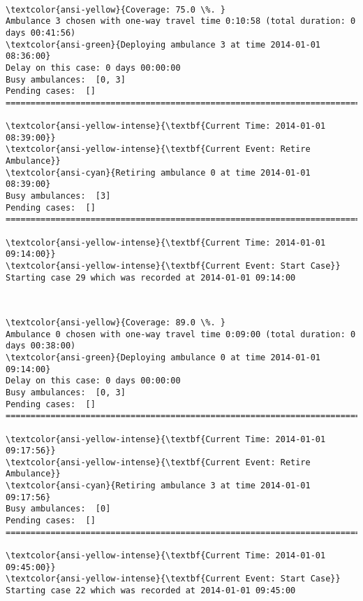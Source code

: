 \documentclass[11pt]{article}
\begin{document}
    \begin{center}
    \end{center}
    { \hspace*{\fill} \\}
    
    \begin{Verbatim}[commandchars=\\\{\}]
\textcolor{ansi-yellow}{Coverage: 75.0 \%. }
Ambulance 3 chosen with one-way travel time 0:10:58 (total duration: 0 days 00:41:56)
\textcolor{ansi-green}{Deploying ambulance 3 at time 2014-01-01 08:36:00}
Delay on this case: 0 days 00:00:00
Busy ambulances:  [0, 3]
Pending cases:  []
========================================================================

\textcolor{ansi-yellow-intense}{\textbf{Current Time: 2014-01-01 08:39:00}}
\textcolor{ansi-yellow-intense}{\textbf{Current Event: Retire Ambulance}}
\textcolor{ansi-cyan}{Retiring ambulance 0 at time 2014-01-01 08:39:00}
Busy ambulances:  [3]
Pending cases:  []
========================================================================

\textcolor{ansi-yellow-intense}{\textbf{Current Time: 2014-01-01 09:14:00}}
\textcolor{ansi-yellow-intense}{\textbf{Current Event: Start Case}}
Starting case 29 which was recorded at 2014-01-01 09:14:00

    \end{Verbatim}

    \begin{center}
    \end{center}
    { \hspace*{\fill} \\}
    
    \begin{Verbatim}[commandchars=\\\{\}]
\textcolor{ansi-yellow}{Coverage: 89.0 \%. }
Ambulance 0 chosen with one-way travel time 0:09:00 (total duration: 0 days 00:38:00)
\textcolor{ansi-green}{Deploying ambulance 0 at time 2014-01-01 09:14:00}
Delay on this case: 0 days 00:00:00
Busy ambulances:  [0, 3]
Pending cases:  []
========================================================================

\textcolor{ansi-yellow-intense}{\textbf{Current Time: 2014-01-01 09:17:56}}
\textcolor{ansi-yellow-intense}{\textbf{Current Event: Retire Ambulance}}
\textcolor{ansi-cyan}{Retiring ambulance 3 at time 2014-01-01 09:17:56}
Busy ambulances:  [0]
Pending cases:  []
========================================================================

\textcolor{ansi-yellow-intense}{\textbf{Current Time: 2014-01-01 09:45:00}}
\textcolor{ansi-yellow-intense}{\textbf{Current Event: Start Case}}
Starting case 22 which was recorded at 2014-01-01 09:45:00

    \end{Verbatim}
\end{document}
